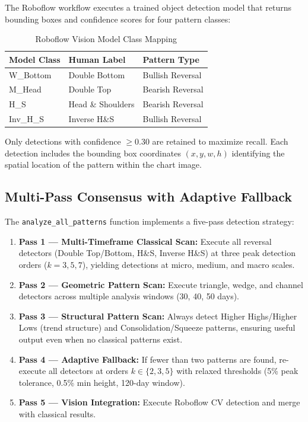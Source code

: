 \documentclass[12pt,a4paper]{article}
\begin{document}
The Roboflow workflow executes a trained object detection model that returns bounding boxes and confidence scores for four pattern classes:

\begin{table}[H]
\centering
\caption{Roboflow Vision Model Class Mapping}
\begin{tabular}{@{}lll@{}}
\toprule
\textbf{Model Class} & \textbf{Human Label} & \textbf{Pattern Type} \\
\midrule
W\_Bottom & Double Bottom & Bullish Reversal \\
M\_Head & Double Top & Bearish Reversal \\
H\_S & Head \& Shoulders & Bearish Reversal \\
Inv\_H\_S & Inverse H\&S & Bullish Reversal \\
\bottomrule
\end{tabular}
\label{tab:roboflow_classes}
\end{table}

Only detections with confidence $\geq 0.30$ are retained to maximize recall. Each detection includes the bounding box coordinates $(x, y, w, h)$ identifying the spatial location of the pattern within the chart image.

\subsection{Multi-Pass Consensus with Adaptive Fallback}

The \texttt{analyze\_all\_patterns} function implements a five-pass detection strategy:

\begin{enumerate}[label=\arabic*.]
    \item \textbf{Pass 1 --- Multi-Timeframe Classical Scan:} Execute all reversal detectors (Double Top/Bottom, H\&S, Inverse H\&S) at three peak detection orders ($k = 3, 5, 7$), yielding detections at micro, medium, and macro scales.
    \item \textbf{Pass 2 --- Geometric Pattern Scan:} Execute triangle, wedge, and channel detectors across multiple analysis windows (30, 40, 50 days).
    \item \textbf{Pass 3 --- Structural Pattern Scan:} Always detect Higher Highs/Higher Lows (trend structure) and Consolidation/Squeeze patterns, ensuring useful output even when no classical patterns exist.
    \item \textbf{Pass 4 --- Adaptive Fallback:} If fewer than two patterns are found, re-execute all detectors at orders $k \in \{2, 3, 5\}$ with relaxed thresholds (5\% peak tolerance, 0.5\% min height, 120-day window).
    \item \textbf{Pass 5 --- Vision Integration:} Execute Roboflow CV detection and merge with classical results.
\end{enumerate}
\end{document}
